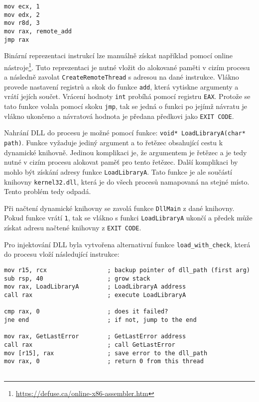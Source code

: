 \documentclass[12pt,a4paper]{article}
\begin{document}
\begin{enumerate}
	\begin{verbatim}
mov ecx, 1
mov edx, 2
mov r8d, 3
mov rax, remote_add
jmp rax
	\end{verbatim}
	
	Binární reprezentaci instrukcí lze manuálně získat například pomocí online nástroje\footnote{\url{https://defuse.ca/online-x86-assembler.htm}}.
	Tuto reprezentaci je nutné vložit do alokované paměti v cizím procesu a následně zavolat \texttt{CreateRemoteThread} s adresou na dané instrukce.
	Vlákno provede nastavení registrů a skok do funkce \texttt{add}, která vytiskne argumenty a vrátí jejích součet.
	Vrácení hodnoty \texttt{int} probíhá pomocí registru \texttt{EAX}.
	Protože se tato funkce volala pomocí skoku \texttt{jmp}, tak se jedná o funkci po jejímž návratu je vlákno ukončeno a návratová hodnota je předana předkovi jako \texttt{EXIT CODE}.
	
	Nahrání DLL do procesu je možné pomocí funkce: \texttt{void* LoadLibraryA(char* path)}.
	Funkce vyžaduje jediný argument a to řetězec obsahující cestu k dynamické knihovně.
	Jedinou komplikaci je, že argumentem je řetězec a je tedy nutné v cizím procesu alokovat paměť pro tento řetězec.
	Další komplikaci by mohlo být získání adresy funkce \texttt{LoadLibraryA}.
	Tato funkce je ale součástí knihovny \texttt{kernel32.dll}, která je do všech procesů namapovaná na stejné místo.
	Tento problém tedy odpadá.
	
	Při načtení dynamické knihovny se zavolá funkce \texttt{DllMain} z dané knihovny.
	Pokud funkce vrátí \texttt{1}, tak se vlákno s funkci \texttt{LoadLibraryA} ukončí a předek může získat adresu načtené knihovny z \texttt{EXIT CODE}.
	
	Pro injektování DLL byla vytvořena alternativní funkce \texttt{load\_with\_check}, která do procesu vloží následující instrukce:
	\begin{verbatim}
mov r15, rcx                 ; backup pointer of dll_path (first arg)
sub rsp, 40                  ; grow stack
mov rax, LoadLibraryA        ; LoadLibraryA address
call rax                     ; execute LoadLibraryA

cmp rax, 0                   ; does it failed?
jne end                      ; if not, jump to the end

mov rax, GetLastError        ; GetLastError address
call rax                     ; call GetLastError
mov [r15], rax               ; save error to the dll_path
mov rax, 0                   ; return 0 from this thread


\end{verbatim}
\end{enumerate}
\end{document}
